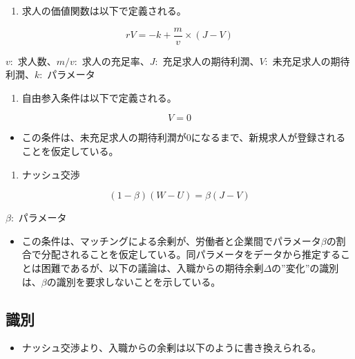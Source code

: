 \documentclass[
]{book}
\providecommand{\tightlist}{%
  \setlength{\itemsep}{0pt}\setlength{\parskip}{0pt}}
\begin{document}
\begin{enumerate}
\def\labelenumi{\arabic{enumi}.}
\setcounter{enumi}{1}
\tightlist
\item
  求人の価値関数は以下で定義される。
\end{enumerate}

\[rV=-k+\frac{m}{v}\times (J-V)\]

\(v:\) 求人数、\(m/v:\) 求人の充足率、\(J:\) 充足求人の期待利潤、\(V:\) 未充足求人の期待利潤、\(k:\) パラメータ

\begin{enumerate}
\def\labelenumi{\arabic{enumi}.}
\setcounter{enumi}{2}
\tightlist
\item
  自由参入条件は以下で定義される。
\end{enumerate}

\[V=0\]

\begin{itemize}
\tightlist
\item
  この条件は、未充足求人の期待利潤が0になるまで、新規求人が登録されることを仮定している。
\end{itemize}

\begin{enumerate}
\def\labelenumi{\arabic{enumi}.}
\setcounter{enumi}{3}
\tightlist
\item
  ナッシュ交渉
\end{enumerate}

\[(1-\beta)(W-U)=\beta(J-V)\]

\(\beta:\) パラメータ

\begin{itemize}
\tightlist
\item
  この条件は、マッチングによる余剰が、労働者と企業間でパラメータ\(\beta\)の割合で分配されることを仮定している。同パラメータをデータから推定することは困難であるが、以下の議論は、入職からの期待余剰\(\Delta\)の''変化''の識別は、\(\beta\)の識別を要求しないことを示している。
\end{itemize}

\hypertarget{ux8b58ux5225}{%
\subsection{識別}\label{ux8b58ux5225}}

\begin{itemize}
\tightlist
\item
  ナッシュ交渉より、入職からの余剰は以下のように書き換えられる。
\end{itemize}
\end{document}
